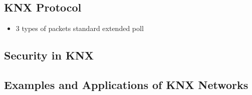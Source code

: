 	\subsection{KNX Protocol}
		\begin{itemize}
			\item 3 types of packets
				\subitem standard
				\subitem extended
				\subitem poll
		\end{itemize}
	
	\subsection{Security in KNX}
	\subsection{Examples and Applications of KNX Networks}

\section{\lonworks}

\section{\bacnet}